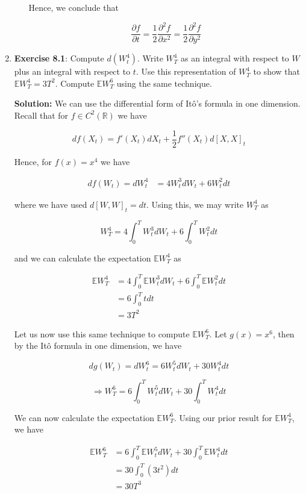 \documentclass[12pt, a4paper]{article}
\begin{document}
\begin{enumerate}
\begin{enumerate}
    Hence, we conclude that 

    $$\frac{\partial f}{\partial t} = \frac{1}{2} \frac{\partial^2 f}{\partial x^2} = \frac{1}{2} \frac{\partial^2 f}{\partial y^2}$$
\end{enumerate}

\item \textbf{Exercise 8.1}: Compute $d(W_t^4)$. Write $W_T^4$ as an integral with respect to $W$ plus an integral with respect to $t$. Use this representation of $W_T^4$ to show that $\mathbb{E}W_T^4=3T^2$. Compute $\mathbb{E}W_T^6$ using the same technique.

\textbf{Solution:} We can use the differential form of Itô's formula in one dimension. Recall that for $f \in C^2(\mathbb{R})$ we have

$$df(X_t)=f'(X_t)dX_t + \frac{1}{2} f''(X_t)d[X,X]_t$$

Hence, for $f(x)=x^4$ we have

\begin{align*}
    df(W_t) = dW_t^4 &= 4W_t^3 dW_t + 6 W_t^2 dt
\end{align*}

where we have used $d[W,W]_t = dt$. Using this, we may write $W_T^4$ as 

$$W_T^4 = 4\int_0^T W_t^3 dW_t + 6 \int_0^T W_t^2 dt$$

and we can calculate the expectation $\mathbb{E} W_T^4$ as 

\begin{align*}
    \mathbb{E} W_T^4 &= 4 \int_0^T \mathbb{E} W_t^3 dW_t + 6 \int_0^T \mathbb{E} W_t^2 dt \\
    &= 6 \int_0^T t dt\\
    &= 3 T^2
\end{align*}

Let us now use this same technique to compute $\mathbb{E} W_T^6$. Let $g(x) = x^6$, then by the Itô formula in one dimension, we have

$$dg(W_t) = dW_t^6 = 6 W_t^5 dW_t + 30 W_t^4 dt$$

$$\Rightarrow W_T^6 = 6 \int_0^T W_t^5 dW_t + 30 \int_0^T W_t^4 dt$$

We can now calculate the expectation $\mathbb{E} W_T^6$. Using our prior result for $\mathbb{E}W_T^4$, we have

\begin{align*}
    \mathbb{E} W_T^6 &= 6 \int_0^T \mathbb{E} W_t^5 dW_t + 30 \int_0^T \mathbb{E} W_t^4 dt\\
    &= 30 \int_0^T (3t^2)dt\\
    &= 30 T^3
\end{align*}


\end{enumerate}
\end{document}
